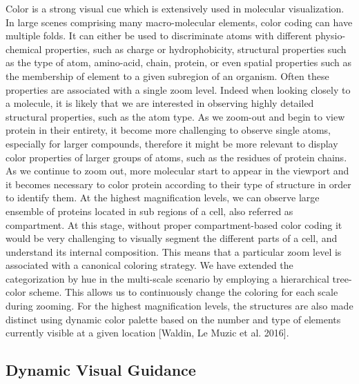 Color is a strong visual cue which is extensively used in molecular visualization.
In large scenes comprising many macro-molecular elements, color coding can have multiple folds.
It can either be used to discriminate atoms with different physio-chemical properties, such as charge or hydrophobicity, structural properties such as the type of atom, amino-acid, chain, protein, or even spatial properties such as the membership of element to a given subregion of an organism.
Often these properties are associated with a single zoom level.
Indeed when looking closely to a molecule, it is likely that we are interested in observing highly detailed structural properties, such as the atom type.
As we zoom-out and begin to view protein in their entirety, it become more challenging to observe single atoms, especially for larger compounds, therefore it might be more relevant to display color properties of larger groups of atoms, such as the residues of protein chains.
As we continue to zoom out, more molecular start to appear in the viewport and it becomes necessary to color protein according to their type of structure in order to identify them.
At the highest magnification levels, we can observe large ensemble of proteins located in sub regions of a cell, also referred as compartment.
At this stage, without proper compartment-based color coding it would be very challenging to visually segment the different parts of a cell, and understand its internal composition.
This means that a particular zoom level is associated with a canonical coloring strategy.
We have extended the categorization by hue in the multi-scale scenario by employing a hierarchical tree-color scheme. 
This allows us to continuously change the coloring for each scale during zooming. 
For the highest magnification levels, the structures are also made distinct using dynamic color palette based on the number and type of elements currently visible at a given location [Waldin, Le Muzic et al. 2016].

\subsection{Dynamic Visual Guidance}

